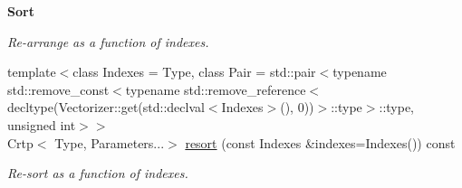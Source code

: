 \begin{Indent}{\bf Sort}
\begin{DoxyCompactItemize}
\begin{DoxyCompactList}\small\item\em Re-\/arrange as a function of indexes. \end{DoxyCompactList}\item 
{\footnotesize template$<$class Indexes  = Type, class Pair  = std\-::pair$<$typename std\-::remove\-\_\-const$<$typename std\-::remove\-\_\-reference$<$decltype(\-Vectorizer\-::get(std\-::declval$<$\-Indexes$>$(), 0))$>$\-::type$>$\-::type, unsigned int$>$$>$ }\\Crtp$<$ Type, Parameters...$>$ \hyperlink{classmagrathea_1_1AbstractNArray_a29c48a5284bc9ad7e11ac898d09cb941}{resort} (const Indexes \&indexes=Indexes()) const 
\begin{DoxyCompactList}\small\item\em Re-\/sort as a function of indexes. \end{DoxyCompactList}\end{DoxyCompactItemize}
\end{Indent}
